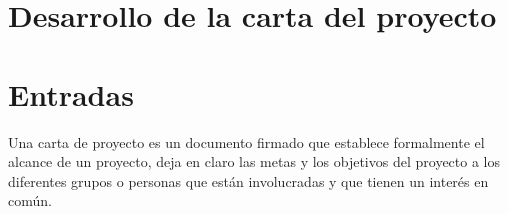 \documentclass[letterpaper,12pt,openright,oneside]{article}
\theoremstyle{plain}
\begin{document}
\section*{Desarrollo de la carta del proyecto}

\section*{Entradas}
% 
% 

Una carta de proyecto es un documento firmado que establece formalmente el alcance de un proyecto, deja en claro las metas y los objetivos del proyecto a los diferentes grupos o personas que están involucradas y que tienen un interés en común.

\end{document}
